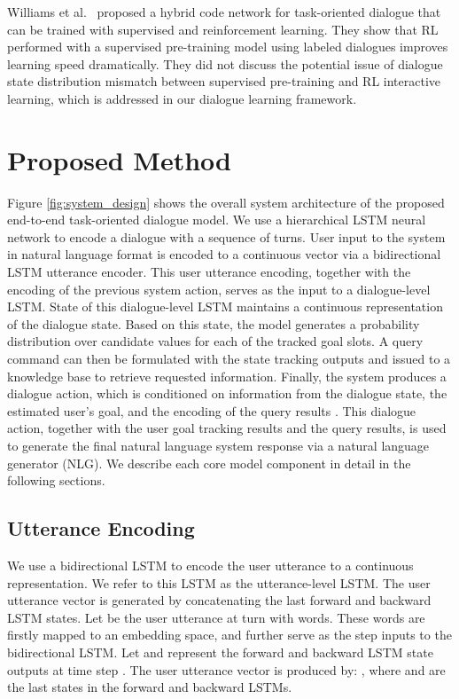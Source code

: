\documentclass[11pt,a4paper]{article}
\begin{document}
    Williams et al.~ proposed a hybrid code network for task-oriented dialogue that can be trained with supervised and reinforcement learning. They show that RL performed with a supervised pre-training model using labeled dialogues improves learning speed dramatically. They did not discuss the potential issue of dialogue state distribution mismatch between supervised pre-training and RL interactive learning, which is addressed in our dialogue learning framework.

\label{sec:method}
\section{Proposed Method}
    Figure \ref{fig:system_design} shows the overall system architecture of the proposed end-to-end task-oriented dialogue model. We use a hierarchical LSTM neural network to encode a dialogue with a sequence of turns. User input to the system in natural language format is encoded to a continuous vector via a bidirectional LSTM utterance encoder. This user utterance encoding, together with the encoding of the previous system action, serves as the input to a dialogue-level LSTM. State of this dialogue-level LSTM maintains a continuous representation of the dialogue state. Based on this state, the model generates a probability distribution over candidate values for each of the tracked goal slots. A query command can then be formulated with the state tracking outputs and issued to a knowledge base to retrieve requested information. Finally, the system produces a dialogue action, which is conditioned on information from the dialogue state, the estimated user's goal, and the encoding of the query results . This dialogue action, together with the user goal tracking results and the query results, is used to generate the final natural language system response via a natural language generator (NLG). We describe each core model component in detail in the following sections.

\subsection{Utterance Encoding}
    We use a bidirectional LSTM to encode the user utterance to a continuous representation. We refer to this LSTM as the utterance-level LSTM. The user utterance vector is generated by concatenating the last forward and backward LSTM states. Let  be the user utterance at turn  with  words. These words are firstly mapped to an embedding space, and further serve as the step inputs to the bidirectional LSTM. Let  and  represent the forward and backward LSTM state outputs at time step . The user utterance vector  is produced by: , where  and  are the last states in the forward and backward LSTMs.
    
\end{document}

